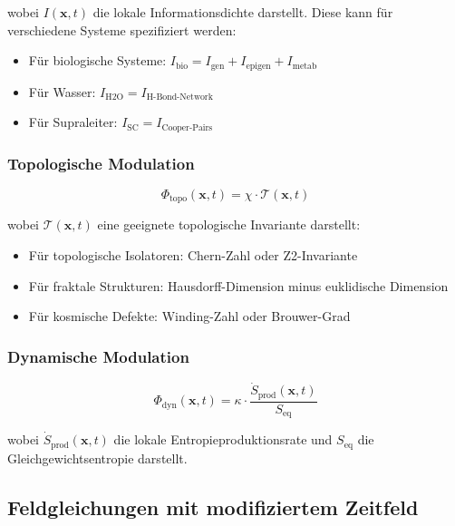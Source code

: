 \documentclass[12pt,a4paper]{article}
\begin{document}
	wobei $I(\mathbf{x}, t)$ die lokale Informationsdichte darstellt. Diese kann für verschiedene Systeme spezifiziert werden:
	
	\begin{itemize}
		\item Für biologische Systeme: $I_{\text{bio}} = I_{\text{gen}} + I_{\text{epigen}} + I_{\text{metab}}$
		\item Für Wasser: $I_{\text{H2O}} = I_{\text{H-Bond-Network}}$
		\item Für Supraleiter: $I_{\text{SC}} = I_{\text{Cooper-Pairs}}$
	\end{itemize}
	
	\subsubsection{Topologische Modulation}
	
	\begin{equation}
		\Phi_{\text{topo}}(\mathbf{x}, t) = \chi \cdot \mathcal{T}(\mathbf{x}, t)
	\end{equation}
	
	wobei $\mathcal{T}(\mathbf{x}, t)$ eine geeignete topologische Invariante darstellt:
	
	\begin{itemize}
		\item Für topologische Isolatoren: Chern-Zahl oder Z2-Invariante
		\item Für fraktale Strukturen: Hausdorff-Dimension minus euklidische Dimension
		\item Für kosmische Defekte: Winding-Zahl oder Brouwer-Grad
	\end{itemize}
	
	\subsubsection{Dynamische Modulation}
	
	\begin{equation}
		\Phi_{\text{dyn}}(\mathbf{x}, t) = \kappa \cdot \frac{\dot{S}_{\text{prod}}(\mathbf{x}, t)}{S_{\text{eq}}}
	\end{equation}
	
	wobei $\dot{S}_{\text{prod}}(\mathbf{x}, t)$ die lokale Entropieproduktionsrate und $S_{\text{eq}}$ die Gleichgewichtsentropie darstellt.
	
	\subsection{Feldgleichungen mit modifiziertem Zeitfeld}
	
\end{document}

